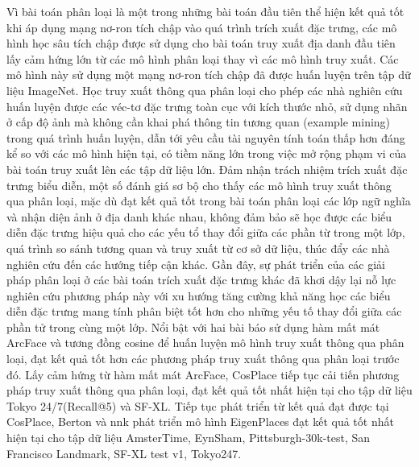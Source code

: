 Vì bài toán phân loại là một trong những bài toán đầu tiên thể hiện kết quả tốt khi áp dụng mạng nơ-ron tích chập vào quá trình trích xuất đặc trưng, các mô hình học sâu tích chập được sử dụng cho bài toán truy xuất địa danh đầu tiên lấy cảm hứng lớn từ các mô hình phân loại thay vì các mô hình truy xuất. Các mô hình này sử dụng một mạng nơ-ron tích chập đã được huấn luyện trên tập dữ liệu ImageNet\cite{krizhevsky2012imagenet}. Học truy xuất thông qua phân loại cho phép các nhà nghiên cứu huấn luyện được các véc-tơ đặc trưng toàn cục với kích thước nhỏ, sử dụng nhãn ở cấp độ ảnh mà không cần khai phá thông tin tương quan (example mining) trong quá trình huấn luyện, dẫn tới yêu cầu tài nguyên tính toán thấp hơn đáng kể so với các mô hình hiện tại, có tiềm năng lớn trong việc mở rộng phạm vi của bài toán truy xuất lên các tập dữ liệu lớn. Đảm nhận trách nhiệm trích xuất đặc trưng biểu diễn, một số đánh giá sơ bộ cho thấy các mô hình truy xuất thông qua phân loại, mặc dù đạt kết quả tốt trong bài toán phân loại các lớp ngữ nghĩa và nhận diện ảnh ở địa danh khác nhau, không đảm bảo sẽ học được các biểu diễn đặc trưng hiệu quả cho các yếu tổ thay đổi giữa các phần từ trong một lớp, quá trình so sánh tương quan và truy xuất từ cơ sở dữ liệu\cite{arandjelović2016netvlad, gordo2016deep, randenovic2016BoW}, thúc đẩy các nhà nghiên cứu đến các hướng tiếp cận khác. Gần đây, sự phát triển của các giải pháp phân loại ở các bài toán trích xuất đặc trưng khác đã khơi dậy lại nỗ lực nghiên cứu phương pháp này với xu hướng tăng cường khả năng học các biểu diễn đặc trưng mang tính phân biệt tốt hơn cho những yếu tố thay đổi giữa các phần tử trong cùng một lớp. Nổi bật với hai bài báo \cite{cao2020unifying, yokoo2020twostage} sử dụng hàm mất mát ArcFace\cite{Deng_2022} và tương đồng cosine để huấn luyện mô hình truy xuất thông qua phân loại, đạt kết quả tốt hơn các phương pháp truy xuất thông qua phân loại trước đó. Lấy cảm hứng từ hàm mất mát ArcFace\cite{Deng_2022}, CosPlace\cite{berton2022rethinking} tiếp tục cải tiến phương pháp truy xuất thông qua phân loại, đạt kết quả tốt nhất hiện tại cho tập dữ liệu Tokyo 24/7(Recall@5)\cite{Torii-CVPR2015} và SF-XL\cite{berton2022rethinking}. Tiếp tục phát triển từ kết quả đạt được tại CosPlace\cite{berton2022rethinking}, Berton và nnk phát triển mô hình EigenPlaces\cite{berton2023eigenplaces} đạt kết quả tốt nhất hiện tại cho tập dữ liệu AmsterTime\cite{yildiz2022amstertime}, EynSham\cite{eynsham2009}, Pittsburgh-30k-test\cite{6618963}, San Francisco Landmark\cite{5995610}, SF-XL test v1\cite{berton2022rethinking}, Tokyo247\cite{Torii-CVPR2015}.


